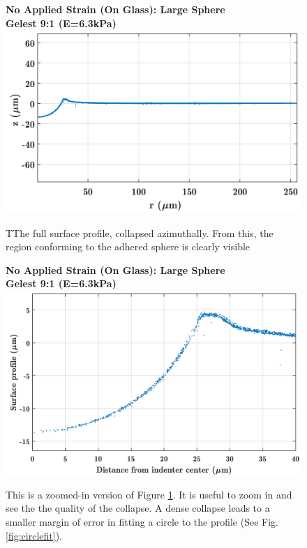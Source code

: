 \begin{figure}[h!]
	\centering
	\large \textbf{No Applied Strain (On Glass): Large Sphere}\\ \vspace{.4 em}
	\large \textbf{Gelest 9:1 (E=6.3kPa)}
	\includegraphics[width=\linewidth]{Chapters/Figures/sphere011_ia/side_collapsed}
	\caption[Collapsed Side Profile]{TThe full surface profile, collapsed azimuthally. From this, the region conforming to the adhered sphere is clearly visible}
	\label{fig:sidecollapsed}
\end{figure}
\begin{figure}[h!]
	\centering
	\large \textbf{No Applied Strain (On Glass): Large Sphere}\\ \vspace{.4 em}
	\large \textbf{Gelest 9:1 (E=6.3kPa)}
	\includegraphics[width=\linewidth]{Chapters/Figures/sphere011_ia/side_collapsed_zoomed}
	\caption[Collapsed Side Profile: Zoomed]{This is a zoomed-in version of Figure \ref{fig:sidecollapsed}. It is useful to zoom in and see the the quality of the collapse. A dense collapse leads to a smaller margin of error in fitting a circle to the profile (See Fig. \ref{fig:circlefit}).}
	\label{fig:sidecollapsedzoomed}
\end{figure}
